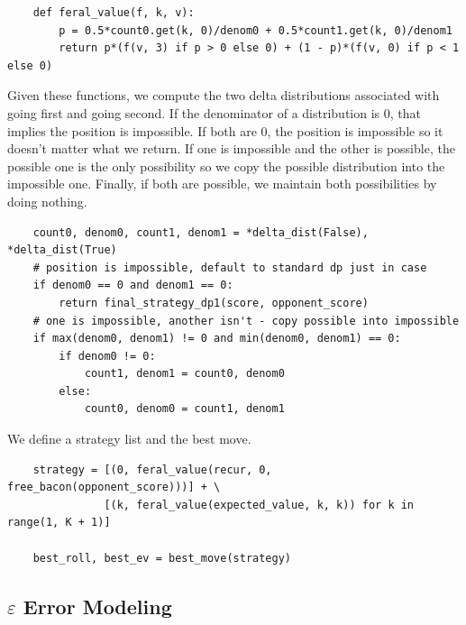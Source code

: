 \documentclass[11pt, oneside]{article}
\begin{document}
\begin{verbatim}
    def feral_value(f, k, v):
        p = 0.5*count0.get(k, 0)/denom0 + 0.5*count1.get(k, 0)/denom1
        return p*(f(v, 3) if p > 0 else 0) + (1 - p)*(f(v, 0) if p < 1 else 0)
\end{verbatim} 

Given these functions, we compute the two delta distributions associated 
with going first and going second. If the denominator of a distribution is 0,
that implies the position is impossible.
If both are 0, the position is impossible so it doesn't matter what we return.
If one is impossible and the other is possible, the possible one is the 
only possibility so we copy the possible distribution into the impossible one.
Finally, if both are possible, we maintain both possibilities by doing nothing.

\begin{verbatim}
    count0, denom0, count1, denom1 = *delta_dist(False), *delta_dist(True) 
    # position is impossible, default to standard dp just in case
    if denom0 == 0 and denom1 == 0:
        return final_strategy_dp1(score, opponent_score)
    # one is impossible, another isn't - copy possible into impossible
    if max(denom0, denom1) != 0 and min(denom0, denom1) == 0:
        if denom0 != 0:
            count1, denom1 = count0, denom0
        else:
            count0, denom0 = count1, denom1 
\end{verbatim} 

We define a strategy list and the best move.

\begin{verbatim}
    strategy = [(0, feral_value(recur, 0, free_bacon(opponent_score)))] + \
               [(k, feral_value(expected_value, k, k)) for k in range(1, K + 1)]

    best_roll, best_ev = best_move(strategy)
\end{verbatim} 

\newpage

\subsection{\( \varepsilon \) Error Modeling}
\end{document}
